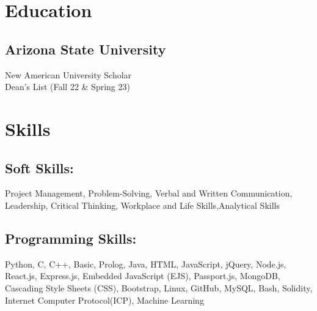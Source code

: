 \documentclass[a4paper]{deedy-resume} %
\begin{document}
\begin{minipage}[t]{0.33\textwidth} %


\section{Education} 



\subsection{Arizona State University}


\textbullet{} New American University Scholar \\
\textbullet{} Dean's List (Fall 22 \& Spring 23)



\sectionspace %




\section{Skills}

\subsection{Soft Skills:}

Project Management, Problem-Solving, Verbal and Written Communication, Leadership, Critical Thinking, Workplace and Life Skills,Analytical Skills


\sectionspace %


\subsection{Programming Skills:}

Python, C, C++, Basic, Prolog, Java, HTML, JavaScript, jQuery, Node.js, React.js, Express.js, Embedded JavaScript (EJS),
Passport.js, MongoDB, Cascading Style Sheets (CSS), Bootstrap, Linux, GitHub, MySQL, Bash, Solidity, Internet Computer Protocol(ICP), Machine
Learning



\end{minipage}
\end{document}
